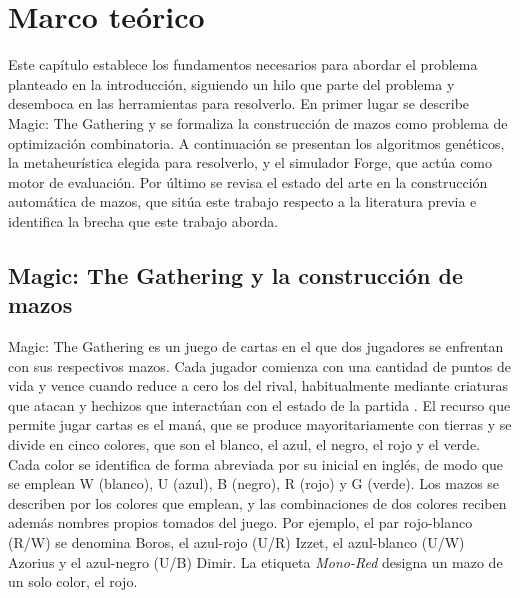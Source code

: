 
\chapter{Marco teórico}
\label{cap:marco}

Este capítulo establece los fundamentos necesarios para abordar el problema planteado en la introducción, siguiendo un hilo que parte del problema y desemboca en las herramientas para resolverlo. En primer lugar se describe Magic: The Gathering y se formaliza la construcción de mazos como problema de optimización combinatoria. A continuación se presentan los algoritmos genéticos, la metaheurística elegida para resolverlo, y el simulador Forge, que actúa como motor de evaluación. Por último se revisa el estado del arte en la construcción automática de mazos, que sitúa este trabajo respecto a la literatura previa e identifica la brecha que este trabajo aborda.

\section{Magic: The Gathering y la construcción de mazos}
\label{sec:mtg}

Magic: The Gathering es un juego de cartas en el que dos jugadores se enfrentan con sus respectivos mazos. Cada jugador comienza con una cantidad de puntos de vida y vence cuando reduce a cero los del rival, habitualmente mediante criaturas que atacan y hechizos que interactúan con el estado de la partida \cite{wotc_rules}. El recurso que permite jugar cartas es el maná, que se produce mayoritariamente con tierras y se divide en cinco colores, que son el blanco, el azul, el negro, el rojo y el verde. Cada color se identifica de forma abreviada por su inicial en inglés, de modo que se emplean W (blanco), U (azul), B (negro), R (rojo) y G (verde). Los mazos se describen por los colores que emplean, y las combinaciones de dos colores reciben además nombres propios tomados del juego. Por ejemplo, el par rojo-blanco (R/W) se denomina Boros, el azul-rojo (U/R) Izzet, el azul-blanco (U/W) Azorius y el azul-negro (U/B) Dimir. La etiqueta \emph{Mono-Red} designa un mazo de un solo color, el rojo.

